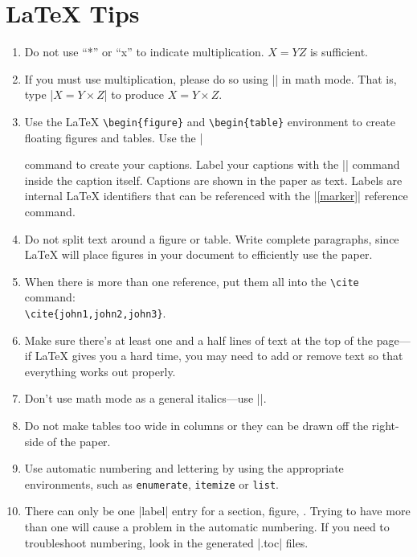 \section{\LaTeX{} Tips}
\begin{enumerate}
\item Do not use ``*'' or ``x'' to indicate multiplication.  $X=YZ$ is sufficient.
\item If you must use multiplication, please do so using |\times| in
  math mode. That is, type |$X=Y\times Z$| to produce $X=Y\times Z$.
\item Use the \LaTeX{} \verb|\begin{figure}| and \verb|\begin{table}| environment to
  create floating figures and tables. Use the |\caption| command
  to create your captions. Label your captions with the
  |\label{marker}| command inside the caption itself. Captions are shown
  in the paper as text.  Labels are internal \LaTeX{} identifiers that can
  be referenced with the |\ref{marker}| reference command.
\item Do not split text around a figure or table.  Write complete paragraphs,
  since \LaTeX{} will place figures in your document to efficiently use the paper.  
\item When there is more than one reference, put them all into the 
  \verb|\cite| command: \\ \verb|\cite{john1,john2,john3}|.
\item Make sure there's at least one and a half lines of text at the
  top of the page---if \LaTeX{} gives you a hard time, you may need to
  add or remove text so that everything works out properly.
\item Don't use math mode as a general italics---use |\emph{}|. 
\item Do not make tables too wide in columns or they can be drawn off the right-side of the paper.
\item Use automatic numbering and lettering by using the appropriate environments, such as
  \texttt{enumerate}, \texttt{itemize} or \texttt{list}.
\item There can only be one |label| entry for a section, figure, \etc.  Trying to have more than one will
  cause a problem in the automatic numbering.  If you need to troubleshoot numbering, look in the generated |.toc| files.
\end{enumerate}


